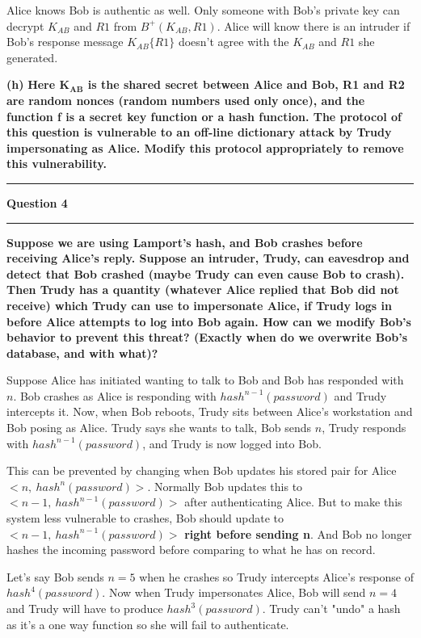 \documentclass[11pt]{article}
\newcommand\question[2]{\vspace{.25in}\hrule\textbf{#1}\vspace{.5em}\hrule\vspace{.10in}}
\renewcommand\part[1]{\vspace{.10in}\textbf{(#1)}}
\begin{document}
Alice knows Bob is authentic as well. Only someone with Bob's private key can decrypt $K_{AB}$ and $R1$ from $B^+(K_{AB}, R1)$. Alice will know there is an intruder if Bob's response message $K_{AB}\{R1\}$ doesn't agree with the $K_{AB}$ and $R1$ she generated.

\part{h} \textbf{Here $\mathbf{K_{AB}}$ is the shared secret between Alice and Bob, R1 and R2 are random nonces (random numbers used only once), and the function f is a secret key function or a hash function. The protocol of this question is vulnerable to an off-line dictionary attack by Trudy impersonating as Alice. Modify this protocol appropriately to remove this vulnerability.}

\question{Question 4}

\part{a} \textbf{Suppose we are using Lamport's hash, and Bob crashes before receiving Alice's reply. Suppose an intruder, Trudy, can eavesdrop and detect that Bob crashed (maybe Trudy can even cause Bob to crash). Then Trudy has a quantity (whatever Alice replied that Bob did not receive) which Trudy can use to impersonate Alice, if Trudy logs in before Alice attempts to log into Bob again. How can we modify Bob's behavior to prevent this threat? (Exactly when do we overwrite Bob's database, and with what)?}

Suppose Alice has initiated wanting to talk to Bob and Bob has responded with $n$. Bob crashes as Alice is responding with $hash^{n-1}(password)$ and Trudy intercepts it. Now, when Bob reboots, Trudy sits between Alice's workstation and Bob posing as Alice. Trudy says she wants to talk, Bob sends $n$, Trudy responds with $hash^{n-1}(password)$, and Trudy is now logged into Bob.

This can be prevented by changing when Bob updates his stored pair for Alice $<n, \ hash^n(password)>$. Normally Bob updates this to $<n-1, \ hash^{n-1}(password)>$ after authenticating Alice. But to make this system less vulnerable to crashes, Bob should update to $<n-1, \ hash^{n-1}(password)>$ \textbf{right before sending n}. And Bob no longer hashes the incoming password before comparing to what he has on record.

Let's say Bob sends $n = 5$ when he crashes so Trudy intercepts Alice's response of $hash^{4}(password)$. Now when Trudy impersonates Alice, Bob will send $n = 4$ and Trudy will have to produce $hash^{3}(password)$. Trudy can't "undo" a hash as it's a one way function so she will fail to authenticate.
\end{document}
